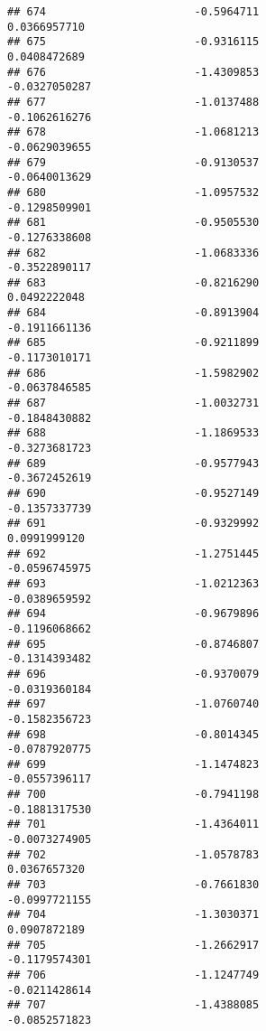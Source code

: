 \documentclass[
]{article}
\begin{document}
\begin{verbatim}
## 674                       -0.5964711                          0.0366957710
## 675                       -0.9316115                          0.0408472689
## 676                       -1.4309853                         -0.0327050287
## 677                       -1.0137488                         -0.1062616276
## 678                       -1.0681213                         -0.0629039655
## 679                       -0.9130537                         -0.0640013629
## 680                       -1.0957532                         -0.1298509901
## 681                       -0.9505530                         -0.1276338608
## 682                       -1.0683336                         -0.3522890117
## 683                       -0.8216290                          0.0492222048
## 684                       -0.8913904                         -0.1911661136
## 685                       -0.9211899                         -0.1173010171
## 686                       -1.5982902                         -0.0637846585
## 687                       -1.0032731                         -0.1848430882
## 688                       -1.1869533                         -0.3273681723
## 689                       -0.9577943                         -0.3672452619
## 690                       -0.9527149                         -0.1357337739
## 691                       -0.9329992                          0.0991999120
## 692                       -1.2751445                         -0.0596745975
## 693                       -1.0212363                         -0.0389659592
## 694                       -0.9679896                         -0.1196068662
## 695                       -0.8746807                         -0.1314393482
## 696                       -0.9370079                         -0.0319360184
## 697                       -1.0760740                         -0.1582356723
## 698                       -0.8014345                         -0.0787920775
## 699                       -1.1474823                         -0.0557396117
## 700                       -0.7941198                         -0.1881317530
## 701                       -1.4364011                         -0.0073274905
## 702                       -1.0578783                          0.0367657320
## 703                       -0.7661830                         -0.0997721155
## 704                       -1.3030371                          0.0907872189
## 705                       -1.2662917                         -0.1179574301
## 706                       -1.1247749                         -0.0211428614
## 707                       -1.4388085                         -0.0852571823

\end{verbatim}
\end{document}
